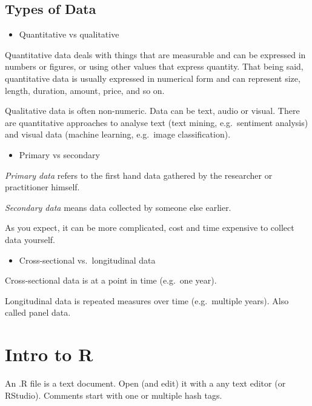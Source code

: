\documentclass[
]{book}
\providecommand{\tightlist}{%
  \setlength{\itemsep}{0pt}\setlength{\parskip}{0pt}}
\begin{document}
\hypertarget{types-of-data}{%
\section*{Types of Data}\label{types-of-data}}

\begin{itemize}
\tightlist
\item
  Quantitative vs qualitative
\end{itemize}

Quantitative data deals with things that are measurable and can be expressed in numbers or figures, or using other values that express quantity. That being said, quantitative data is usually expressed in numerical form and can represent size, length, duration, amount, price, and so on.

Qualitative data is often non-numeric. Data can be text, audio or visual. There are quantitative approaches to analyse text (text mining, e.g.~sentiment analysis) and visual data (machine learning, e.g.~image classification).

\begin{itemize}
\tightlist
\item
  Primary vs secondary
\end{itemize}

\emph{Primary data} refers to the first hand data gathered by the researcher or practitioner himself.

\emph{Secondary data} means data collected by someone else earlier.

As you expect, it can be more complicated, cost and time expensive to collect data yourself.

\begin{itemize}
\tightlist
\item
  Cross-sectional vs.~longitudinal data
\end{itemize}

Cross-sectional data is at a point in time (e.g.~one year).

Longitudinal data is repeated measures over time (e.g.~multiple years). Also called panel data.

\hypertarget{intro-to-r}{%
\chapter*{Intro to R}\label{intro-to-r}}

An .R file is a text document. Open (and edit) it with a any text editor (or RStudio). Comments start with one or multiple hash tags.
\end{document}
